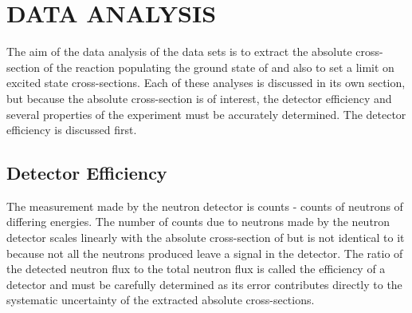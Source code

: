 %
%
%
%
%
%
%
%

%
%

\chapter{DATA ANALYSIS}
\label{chap:dataAnalysis}

The aim of the data analysis of the \reaction data sets is to extract the absolute cross-section of the reaction populating the ground state of \GeTargets and also to set a limit on excited \zp state cross-sections.  Each of these analyses is discussed in its own section, but because the absolute cross-section is of interest, the detector efficiency and several properties of the experiment must be accurately determined.  The detector efficiency is discussed first.

\section{Detector Efficiency}

The measurement made by the neutron detector is counts - counts of neutrons of differing energies.  The number of counts due to neutrons made by the neutron detector scales linearly with the absolute cross-section of \reaction but is not identical to it because not all the neutrons produced leave a signal in the detector.  The ratio of the detected neutron flux to the total neutron flux is called the efficiency of a detector and must be carefully determined as its error contributes directly to the systematic uncertainty of the extracted absolute cross-sections.

